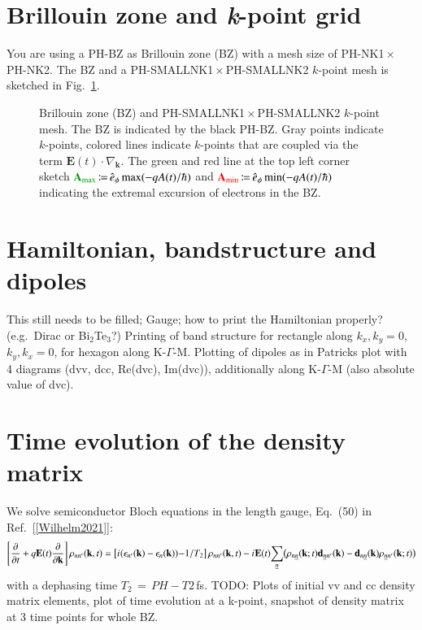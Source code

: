 \documentclass[11pt, a4paper]{scrartcl}
\newlength\figureheight
\newlength\figurewidth
\newcommand{\bE}{\mathbf{E}}
\newcommand{\bk}{\mathbf{k}}
\newcommand{\bA}{\mathbf{A}}
\newcommand{\sd}{\hspace{0.05em}}
\newcommand{\eqt}{\,{=}\,}
\newcommand{\coloneqqt}{\,{\coloneqq}\,}
\newcommand{\rhonnprime}{\rho_{nn'}(\bk,t)}
\newcommand{\un}{\underline{n}}
\begin{document}
\section{Brillouin zone and \textit{k}-point grid}
You are using a PH-BZ as Brillouin zone (BZ) with a mesh size of PH-NK1\,$\times$\,PH-NK2. 
%
The BZ and a PH-SMALLNK1\,$\times$\,PH-SMALLNK2 $k$-point mesh is sketched in Fig.~\ref{fig:kp}.
%
\begin{figure}[h!]\vspace{2em}
\centering
\setlength{} 
\setlength\figurewidth{\textwidth}

\vspace{-1em}
\caption{Brillouin zone (BZ) and PH-SMALLNK1\,$\times$\,PH-SMALLNK2 $k$-point mesh.
%
The BZ is indicated by the black PH-BZ.
%
Gray points indicate $k$-points, colored lines indicate $k$-points that are coupled via  the term $\bE(t)\cdot \nabla_\bk$.
%
The green and red line at the top left corner sketch ${\color{darkgreen}\bA_\text{max}}\coloneqqt\hat{e}_\phi\max (-qA(t)/\hbar)$ and ${\color{red}\bA_\text{min}}\coloneqqt\hat{e}_\phi\min (-qA(t)/\hbar)$ indicating the extremal excursion of  electrons in the BZ.  
}
    \label{fig:kp}
\end{figure}


\section{Hamiltonian, bandstructure and dipoles}
{\color{red}
This still needs to be filled; Gauge; how to print the Hamiltonian properly? (e.g.~Dirac or Bi$_2$Te$_3$?) Printing of band structure for rectangle along $k_x, k_y=0$, $k_y,k_x=0$, for hexagon along K-$\Gamma$-M. Plotting of dipoles as in Patricks plot with 4 diagrams (dvv, dcc, Re(dvc), Im(dvc)), additionally along K-$\Gamma$-M (also absolute value of dvc).
}

\section{Time evolution of the density matrix}
We solve semiconductor Bloch equations in the length gauge, Eq.~(50) in Ref.~[\ref{Wilhelm2021}]:
\begin{align}
    \left[
    \frac{\partial}{\partial t}
    +q\bE(t)\frac{\partial}{\partial \bk}
    \right]\rhonnprime = 
    \big[i\sd(\epsilon_{n'}(\bk)-\epsilon_{n}(\bk))
   \sd {-}1/T_2\big]\,\rhonnprime
    -i\sd \bE(t){\sum_{\un}}
    \big(\rho_{n\un}(\bk;t) \mathbf{d}_{\un n'}(\bk)
    -  \mathbf{d}_{n\un}(\bk)\rho_{\un n'}(\bk;t)
    \big)
\end{align}
with a dephasing time $T_2\eqt PH-T2$\,fs. {\color{red}TODO: Plots of initial vv and cc density matrix elements, plot of time evolution at a k-point, snapshot of density matrix at 3 time points for whole BZ.}
\end{document}
